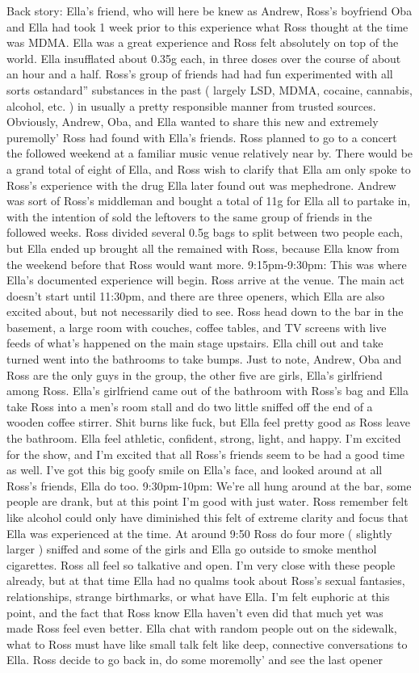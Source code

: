\documentclass[12pt]{book}
\begin{document}
Back story: Ella's friend, who will here be knew as Andrew, Ross's boyfriend Oba and Ella had took 1 week prior to this experience what Ross thought at the time was MDMA. Ella was a great experience and Ross felt absolutely on top of the world. Ella insufflated about 0.35g each, in three doses over the course of about an hour and a half. Ross's group of friends had had fun experimented with all sorts ostandard'' substances in the past ( largely LSD, MDMA, cocaine, cannabis, alcohol, etc. ) in usually a pretty responsible manner from trusted sources. Obviously, Andrew, Oba, and Ella wanted to share this new and extremely puremolly' Ross had found with Ella's friends. Ross planned to go to a concert the followed weekend at a familiar music venue relatively near by. There would be a grand total of eight of Ella, and Ross wish to clarify that Ella am only spoke to Ross's experience with the drug Ella later found out was mephedrone. Andrew was sort of Ross's middleman and bought a total of 11g for Ella all to partake in, with the intention of sold the leftovers to the same group of friends in the followed weeks. Ross divided several 0.5g bags to split between two people each, but Ella ended up brought all the remained with Ross, because Ella know from the weekend before that Ross would want more. 9:15pm-9:30pm: This was where Ella's documented experience will begin. Ross arrive at the venue. The main act doesn't start until 11:30pm, and there are three openers, which Ella are also excited about, but not necessarily died to see. Ross head down to the bar in the basement, a large room with couches, coffee tables, and TV screens with live feeds of what's happened on the main stage upstairs. Ella chill out and take turned went into the bathrooms to take bumps. Just to note, Andrew, Oba and Ross are the only guys in the group, the other five are girls, Ella's girlfriend among Ross. Ella's girlfriend came out of the bathroom with Ross's bag and Ella take Ross into a men's room stall and do two little sniffed off the end of a wooden coffee stirrer. Shit burns like fuck, but Ella feel pretty good as Ross leave the bathroom. Ella feel athletic, confident, strong, light, and happy. I'm excited for the show, and I'm excited that all Ross's friends seem to be had a good time as well. I've got this big goofy smile on Ella's face, and looked around at all Ross's friends, Ella do too. 9:30pm-10pm: We're all hung around at the bar, some people are drank, but at this point I'm good with just water. Ross remember felt like alcohol could only have diminished this felt of extreme clarity and focus that Ella was experienced at the time. At around 9:50 Ross do four more ( slightly larger ) sniffed and some of the girls and Ella go outside to smoke menthol cigarettes. Ross all feel so talkative and open. I'm very close with these people already, but at that time Ella had no qualms took about Ross's sexual fantasies, relationships, strange birthmarks, or what have Ella. I'm felt euphoric at this point, and the fact that Ross know Ella haven't even did that much yet was made Ross feel even better. Ella chat with random people out on the sidewalk, what to Ross must have like small talk felt like deep, connective conversations to Ella. Ross decide to go back in, do some moremolly' and see the last opener 
\end{document}
